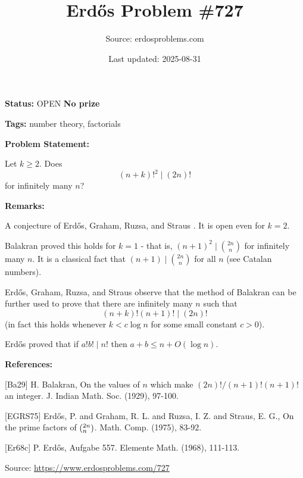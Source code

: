 \documentclass{article}
\title{Erd\H{o}s Problem \#727}
\date{Last updated: 2025-08-31}
\author{Source: erdosproblems.com}
\begin{document}
\maketitle

\noindent\textbf{Status:} OPEN \quad \textbf{No prize}

\noindent\textbf{Tags:} number theory, factorials

\medskip
\noindent\textbf{Problem Statement:}

Let $k\geq 2$. Does\[(n+k)!^2 \mid (2n)!\]for infinitely many $n$?

\bigskip
\noindent\textbf{Remarks:}

A conjecture of Erd\H{o}s, Graham, Ruzsa, and Straus \cite{EGRS75}. It is open even for $k=2$.

Balakran \cite{Ba29} proved this holds for $k=1$ - that is, $(n+1)^2\mid \binom{2n}{n}$ for infinitely many $n$. It is a classical fact that $(n+1)\mid \binom{2n}{n}$ for all $n$ (see Catalan numbers). 

Erd\H{o}s, Graham, Ruzsa, and Straus observe that the method of Balakran can be further used to prove that there are infinitely many $n$ such that\[(n+k)!(n+1)! \mid (2n)!\](in fact this holds whenever $k<c \log n$ for some small constant $c>0$). 

Erd\H{o}s \cite{Er68c} proved that if $a!b!\mid n!$ then $a+b\leq n+O(\log n)$.

\bigskip
\noindent\textbf{References:}

[Ba29] H. Balakran, On the values of $n$ which make $(2n)!/(n+1)!(n+1)!$ an integer. J. Indian Math. Soc. (1929), 97-100.
 
 [EGRS75] Erd\H{o}s, P. and Graham, R. L. and Ruzsa, I. Z. and Straus, E. G., On the prime factors of $(\sp{2n}\sb{n})$. Math. Comp. (1975), 83-92.
 
 [Er68c] P. Erd\H{o}s, Aufgabe 557. Elemente Math. (1968), 111-113.

\bigskip
\noindent\small{Source: \url{https://www.erdosproblems.com/727}}
\end{document}
